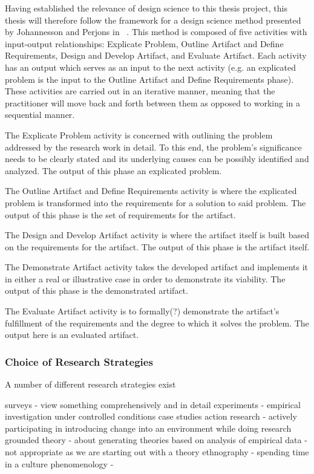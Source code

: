 Having established the relevance of design science to this thesis project, this thesis will therefore follow the framework for a design science method presented by Johannesson and Perjons in ~\cite{johannessonPerjons2012}. This method is composed of five activities with input-output relationships: Explicate Problem, Outline Artifact and Define Requirements, Design and Develop Artifact, and Evaluate Artifact. Each activity has an output which serves as an input to the next activity (e.g. an explicated problem is the input to the Outline Artifact and Define Requirements phase). These activities are carried out in an iterative manner, meaning that the practitioner will move back and forth between them as opposed to working in a sequential manner. 

The Explicate Problem activity is concerned with outlining the problem addressed by the research work in detail. To this end, the problem's significance needs to be clearly stated and its underlying causes can be possibly identified and analyzed. The output of this phase an explicated problem. 

The Outline Artifact and Define Requirements activity is where the explicated problem is transformed into the requirements for a solution to said problem. The output of this phase is the set of requirements for the artifact. 

The Design and Develop Artifact activity is where the artifact itself is built based on the requirements for the artifact. The output of this phase is the artifact itself.

The Demonstrate Artifact activity takes the developed artifact and implements it in either a real or illustrative case in order to demonstrate its viability. The output of this phase is the demonstrated artifact. 

The Evaluate Artifact activity is to formally(?) demonstrate the artifact's fulfillment of the requirements and the degree to which it solves the problem. The output here is an evaluated artifact. 

\subsubsection{Choice of Research Strategies}

A number of different research strategies exist

surveys
  - view something comprehensively and in detail
experiments
  - empirical investigation under controlled conditions
case studies
action research
  - actively participating in introducing change into an environment while doing research
grounded theory
  - about generating theories based on analysis of empirical data
  - not appropriate as we are starting out with a theory
ethnography
  - spending time in a culture
phenomenology
  - 


